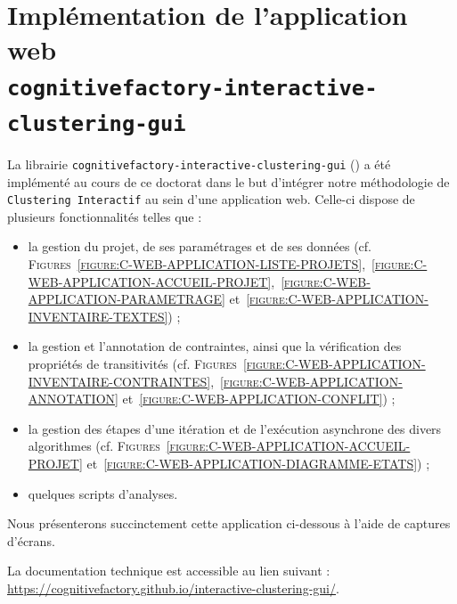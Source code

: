 \section{Implémentation de l'application web \\ \texttt{cognitivefactory-interactive-clustering-gui}}
\label{annex:C.2-DESCRIPTION-IMPLEMENTATION-INTERACTIVE-CLUSTERING-GUI}

	La librairie \texttt{cognitivefactory-interactive-clustering-gui} (\cite{schild-etal:2022:cognitivefactory-interactiveclusteringgui}) a été implémenté au cours de ce doctorat dans le but d'intégrer notre méthodologie de \texttt{Clustering Interactif} au sein d'une application web.
	Celle-ci dispose de plusieurs fonctionnalités telles que :
	\begin{itemize}
		\item la gestion du projet, de ses paramétrages et de ses données (cf. \textsc{Figures}~\textsc{\ref{figure:C-WEB-APPLICATION-LISTE-PROJETS}},~\textsc{\ref{figure:C-WEB-APPLICATION-ACCUEIL-PROJET}},~\textsc{\ref{figure:C-WEB-APPLICATION-PARAMETRAGE}} et~\textsc{\ref{figure:C-WEB-APPLICATION-INVENTAIRE-TEXTES}}) ;
		\item la gestion et l'annotation de contraintes, ainsi que la vérification des propriétés de transitivités (cf. \textsc{Figures}~\textsc{\ref{figure:C-WEB-APPLICATION-INVENTAIRE-CONTRAINTES}},~\textsc{\ref{figure:C-WEB-APPLICATION-ANNOTATION}} et~\textsc{\ref{figure:C-WEB-APPLICATION-CONFLIT}}) ;
		\item la gestion des étapes d'une itération et de l'exécution asynchrone des divers algorithmes (cf. \textsc{Figures}~\textsc{\ref{figure:C-WEB-APPLICATION-ACCUEIL-PROJET}} et~\textsc{\ref{figure:C-WEB-APPLICATION-DIAGRAMME-ETATS}}) ;
		\item quelques scripts d'analyses.
	\end{itemize}
	
	Nous présenterons succinctement cette application ci-dessous à l'aide de captures d'écrans.

	
	\begin{leftBarInformation}
		La documentation technique est accessible au lien suivant : \url{https://cognitivefactory.github.io/interactive-clustering-gui/}.
	\end{leftBarInformation}
	
